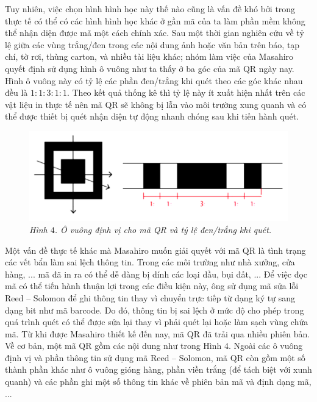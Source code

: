 \begin{multicols}{2}
	\vskip 0.1cm
	Tuy nhiên, việc chọn hình hình học này thế nào cũng là vấn đề khó bởi trong thực tế có thể có các hình hình học khác ở gần mã của ta làm phần mềm không thể nhận diện được mã một cách chính xác. Sau một thời gian nghiên cứu về tỷ lệ giữa các vùng trắng/đen trong các nội dung  ảnh hoặc văn bản trên báo, tạp chí, tờ rơi, thùng carton, và nhiều tài liệu khác; nhóm làm việc của Masahiro quyết định sử dụng hình ô vuông như ta thấy ở ba góc của mã QR ngày nay. Hình ô vuông này có tỷ lệ các phần đen/trắng khi quét theo các góc khác nhau đều là $1 : 1 : 3 : 1 : 1$. Theo kết quả thống kê thì tỷ lệ này ít xuất hiện nhất trên các vật liệu in thực tế nên mã QR sẽ không bị lẫn vào môi trường xung quanh và có thể được thiết bị quét nhận diện tự động nhanh chóng sau khi tiến hành quét.
	\begin{figure}[H]
		\vspace*{-5pt}
		\centering
		\captionsetup{labelformat= empty, justification=centering}
		\includegraphics[width=1\linewidth]{6}
		\caption{\small\textit{\color{toanhocdoisong}Hình $4$. Ô vuông định vị cho mã QR và tỷ lệ đen/trắng khi quét.}}
		\vspace*{-10pt}
	\end{figure}
	Một vấn đề thực tế khác mà Masahiro muốn giải quyết với mã QR là tình trạng các vết bẩn làm sai lệch thông tin. Trong các môi trường như nhà xưởng, cửa hàng, ... mã đã in ra có thể dễ dàng bị dính các loại dầu, bụi đất, ... Để việc đọc mã có thể tiến hành thuận lợi trong các điều kiện này, ông sử dụng mã sửa lỗi Reed -- Solomon để ghi thông tin thay vì chuyển trực tiếp từ dạng ký tự sang dạng bit như mã barcode. Do đó, thông tin bị sai lệch ở mức độ cho phép trong quá trình quét có thể được sửa lại thay vì phải quét lại hoặc làm sạch vùng chứa mã.
	\vskip 0.1cm
	Từ khi được Masahiro thiết kế đến nay, mã QR đã trải qua nhiều phiên bản. Về cơ bản, một mã QR gồm các nội dung như trong Hình $4$. Ngoài các ô vuông định vị và phần thông tin sử dụng mã Reed -- Solomon, mã QR còn gồm một số thành phần khác như ô vuông gióng hàng, phần viền trắng (để tách biệt với xunh quanh) và các phần ghi một số thông tin khác về phiên bản mã và định dạng mã, ...

\end{multicols}
